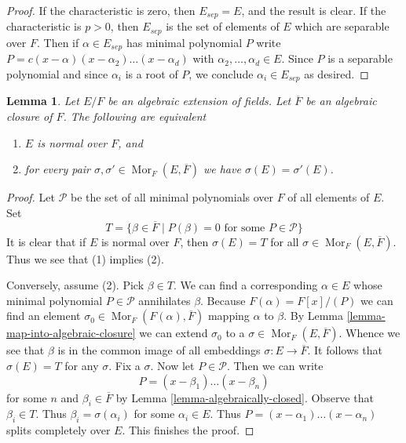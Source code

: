 \documentclass{stacks-project}
\theoremstyle{plain}
\newtheorem{lemma}[subsection]{Lemma}
\theoremstyle{definition}
\theoremstyle{remark}
\numberwithin{equation}{subsection}
\def\Mor{\mathop{\mathrm{Mor}}\nolimits}
\begin{document}
\begin{proof}
If the characteristic is zero, then $E_{sep} = E$, and the result
is clear. If the characteristic is $p > 0$, then $E_{sep}$
is the set of elements of $E$ which are separable over $F$.
Then if $\alpha \in E_{sep}$ has minimal polynomial $P$
write $P = c(x - \alpha)(x - \alpha_2) \ldots (x - \alpha_d)$
with $\alpha_2, \ldots, \alpha_d \in E$. Since
$P$ is a separable polynomial and since $\alpha_i$
is a root of $P$, we conclude $\alpha_i \in E_{sep}$ as desired.
\end{proof}

\begin{lemma}
\label{lemma-characterize-normal}
Let $E/F$ be an algebraic extension of fields. Let $\overline{F}$ be an
algebraic closure of $F$. The following are equivalent
\begin{enumerate}
\item $E$ is normal over $F$, and
\item for every pair $\sigma, \sigma' \in \Mor_F(E, \overline{F})$ we
have $\sigma(E) = \sigma'(E)$.
\end{enumerate}
\end{lemma}

\begin{proof}
Let $\mathcal{P}$ be the set of all minimal polynomials over $F$ of
all elements of $E$. Set
$$
T =
\{\beta \in \overline{F} \mid P(\beta) = 0\text{ for some }P \in \mathcal{P}\}
$$
It is clear that if $E$ is normal over $F$, then $\sigma(E) = T$
for all $\sigma \in \Mor_F(E, \overline{F})$. Thus we see that (1)
implies (2).

\medskip\noindent
Conversely, assume (2). Pick $\beta \in T$.
We can find a corresponding $\alpha \in E$ whose minimal polynomial
$P \in \mathcal{P}$ annihilates $\beta$. Because $F(\alpha) = F[x]/(P)$
we can find an element $\sigma_0 \in \Mor_F(F(\alpha), \overline{F})$ mapping
$\alpha$ to $\beta$. By Lemma \ref{lemma-map-into-algebraic-closure}
we can extend $\sigma_0$ to a $\sigma \in \Mor_F(E, \overline{F})$.
Whence we see that $\beta$ is in the common image of all embeddings
$\sigma : E \to \overline{F}$. It follows that $\sigma(E) = T$
for any $\sigma$. Fix a $\sigma$. Now let $P \in \mathcal{P}$. Then we
can write
$$
P = (x - \beta_1) \ldots (x - \beta_n)
$$
for some $n$ and $\beta_i \in \overline{F}$ by
Lemma \ref{lemma-algebraically-closed}. Observe that $\beta_i \in T$.
Thus $\beta_i = \sigma(\alpha_i)$ for some $\alpha_i \in E$. Thus
$P = (x - \alpha_1) \ldots (x - \alpha_n)$ splits completely over $E$.
This finishes the proof.
\end{proof}
\end{document}
